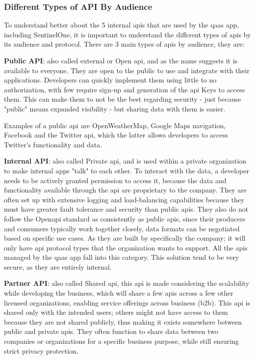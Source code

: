 \begin{multicols}{2}
      \subsubsection{Different Types of API By Audience}
      To understand better about the 5 internal \acrshort{api}s that are used by the \acrshort{qaas} app, including SentinelOne,
      it is important to understand the different types of \acrshort{api}s by its audience and protocol. There are 3 main types of
      \acrshort{api}s by audience, they are:

      \textbf{Public API}: also called external or Open \acrshort{api}, and as the name suggests it is available
      to everyone. They are open to the public to use and integrate with their applications. Developers can quickly
      implement them using little to no authorization, with few require sign-up and generation of the \acrshort{api} Keys
      to access them. This can make them to not be the best regarding security - just because "public" means expanded
      visibility - but sharing data with them is easier.

      Examples of a public \acrshort{api} are OpenWeatherMap, Google Maps navigation, Facebook and the Twitter \acrshort{api},
      which the latter allows  developers to access Twitter's functionality and data.

      \textbf{Internal API}: also called Private \acrshort{api}, and is used within a private organization to make internal
      apps "talk" to each other. To interact with the data, a developer needs to be actively granted permission to access it,
      because the data and functionality available through the \acrshort{api} are proprietary to the company. They are often
      set up with extensive logging and load-balancing capabilities because they must have greater fault tolerance and
      security than public \acrshort{api}s. They also do not follow the Open\acrshort{api} standard as consistently
      as public \acrshort{api}s, since their producers and consumers typically work together closely, data formats
      can be negotiated based on specific use cases. As they are built by specifically the company; it will only have
      \acrshort{api} protocol types that the organization wants to support. All the \acrshort{api}s managed by the
      \acrshort{qaas} app fall into this category. This solution tend to be very secure, as they are entirely internal.

      \textbf{Partner API}: also called Shared \acrshort{api}, this \acrshort{api} is made considering the scalability
      while developing the business, which will share a few \acrshort{api}s across a few other licensed organizations,
      enabling service offerings across business (\acrshort{b2b}). This \acrshort{api} is shared only with the intended
      users; others might not have access to them because they are not shared publicly, thus making it exists somewhere
      between public and private \acrshort{api}s. They often function to share data between two companies or organizations
      for a specific business purpose, while still ensuring strict privacy protection.


\end{multicols}
